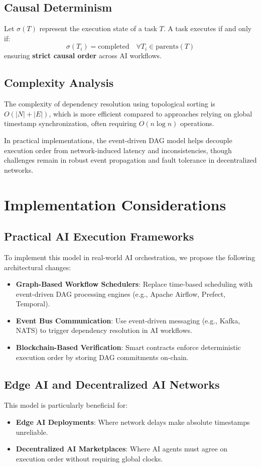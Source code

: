 \documentclass{article}
\begin{document}
\subsection{Causal Determinism}
Let $\sigma(T)$ represent the execution state of a task $T$. A task executes if and only if:
\[
\sigma(T_i) = \text{completed} \quad \forall T_i \in \text{parents}(T)
\]
ensuring \textbf{strict causal order} across AI workflows.

\subsection{Complexity Analysis}
The complexity of dependency resolution using topological sorting is \(O(|N|+|E|)\), which is more efficient compared to approaches relying on global timestamp synchronization, often requiring \(O(n \log n)\) operations.

In practical implementations, the event-driven DAG model helps decouple execution order from network-induced latency and inconsistencies, though challenges remain in robust event propagation and fault tolerance in decentralized networks.

\section{Implementation Considerations}
\subsection{Practical AI Execution Frameworks}
To implement this model in real-world AI orchestration, we propose the following architectural changes:
\begin{itemize}
    \item \textbf{Graph-Based Workflow Schedulers}: Replace time-based scheduling with event-driven DAG processing engines (e.g., Apache Airflow, Prefect, Temporal).
    \item \textbf{Event Bus Communication}: Use event-driven messaging (e.g., Kafka, NATS) to trigger dependency resolution in AI workflows.
    \item \textbf{Blockchain-Based Verification}: Smart contracts enforce deterministic execution order by storing DAG commitments on-chain.
\end{itemize}

\subsection{Edge AI and Decentralized AI Networks}
This model is particularly beneficial for:
\begin{itemize}
    \item \textbf{Edge AI Deployments}: Where network delays make absolute timestamps unreliable.
    \item \textbf{Decentralized AI Marketplaces}: Where AI agents must agree on execution order without requiring global clocks.
\end{itemize}
\end{document}

